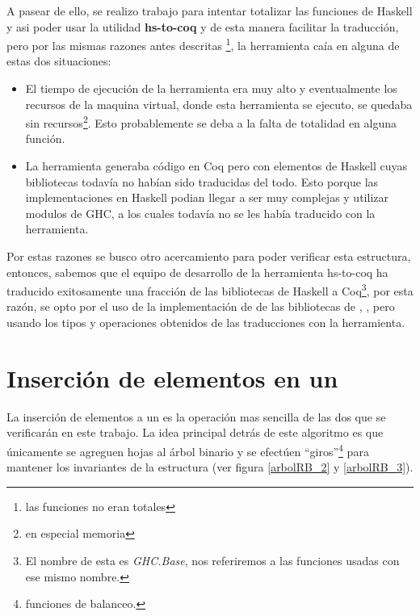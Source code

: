 A pasear de ello, se realizo trabajo para intentar totalizar las funciones de Haskell y asi poder 
usar la utilidad \textbf{hs-to-coq} y de esta manera facilitar la traducci\'on, pero por las mismas
razones antes descritas \footnote{las funciones no eran totales}, la herramienta caía en alguna de estas dos situaciones:

\begin{itemize}
    \item El tiempo de ejecuci\'on de la herramienta era muy alto y eventualmente los recursos de
    la maquina virtual, donde esta herramienta se ejecuto, se quedaba sin recursos\footnote{en
    especial memoria}. Esto probablemente se deba a la falta de totalidad en alguna función.
    \item La herramienta generaba c\'odigo en Coq pero con elementos de Haskell cuyas bibliotecas
    todavía no habían sido traducidas del todo. Esto porque las implementaciones en Haskell podian
    llegar a ser muy complejas y utilizar modulos de GHC, a los cuales todav\'ia no se les hab\'ia
    traducido con la herramienta.
\end{itemize}{}

Por estas razones se busco otro acercamiento para poder verificar esta estructura, entonces,
sabemos que el equipo de desarrollo de la herramienta hs-to-coq ha traducido exitosamente una
fracci\'on de las bibliotecas de Haskell a Coq\footnote{El nombre de esta es \textit{GHC.Base}, nos referiremos a las funciones usadas con ese mismo nombre.}, por esta raz\'on, se opto por el uso de la
implementación de {\arns} de las bibliotecas de {\coq}, \cite{MSetRBT}, pero usando los tipos y
operaciones obtenidos de las traducciones con la herramienta.

\section{Inserción de elementos en un {\arn}}

La inserci\'on de elementos a un {\arn} es la operaci\'on mas sencilla de las dos que se
verificar\'an en este trabajo. La idea principal detrás de este algoritmo es que \'unicamente se 
agreguen hojas al \'arbol binario y se efectúen ``giros''\footnote{funciones de balanceo.} para 
mantener los invariantes de la estructura (ver figura \ref{arbolRB_2} y \ref{arbolRB_3}).

